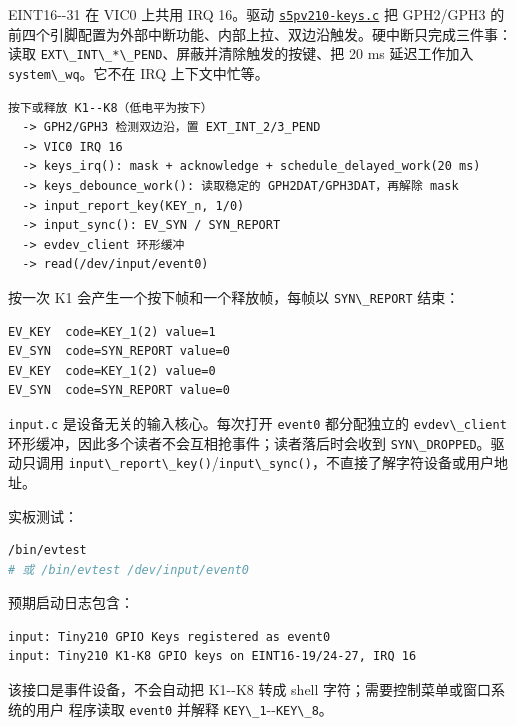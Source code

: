 EINT16-\/-31 在 VIC0 上共用 IRQ 16。驱动
\href{../../../kernel/drivers/input/keyboard/s5pv210-keys.c}{\passthrough{\lstinline!s5pv210-keys.c!}}
把 GPH2/GPH3
的前四个引脚配置为外部中断功能、内部上拉、双边沿触发。硬中断只完成三件事：读取
\passthrough{\lstinline!EXT\_INT\_*\_PEND!}、屏蔽并清除触发的按键、把 20
ms 延迟工作加入 \passthrough{\lstinline!system\_wq!}。它不在 IRQ
上下文中忙等。

\begin{lstlisting}
按下或释放 K1--K8（低电平为按下）
  -> GPH2/GPH3 检测双边沿，置 EXT_INT_2/3_PEND
  -> VIC0 IRQ 16
  -> keys_irq(): mask + acknowledge + schedule_delayed_work(20 ms)
  -> keys_debounce_work(): 读取稳定的 GPH2DAT/GPH3DAT，再解除 mask
  -> input_report_key(KEY_n, 1/0)
  -> input_sync(): EV_SYN / SYN_REPORT
  -> evdev_client 环形缓冲
  -> read(/dev/input/event0)
\end{lstlisting}

按一次 K1 会产生一个按下帧和一个释放帧，每帧以
\passthrough{\lstinline!SYN\_REPORT!} 结束：

\begin{lstlisting}
EV_KEY  code=KEY_1(2) value=1
EV_SYN  code=SYN_REPORT value=0
EV_KEY  code=KEY_1(2) value=0
EV_SYN  code=SYN_REPORT value=0
\end{lstlisting}

\passthrough{\lstinline!input.c!} 是设备无关的输入核心。每次打开
\passthrough{\lstinline!event0!} 都分配独立的
\passthrough{\lstinline!evdev\_client!}
环形缓冲，因此多个读者不会互相抢事件；读者落后时会收到
\passthrough{\lstinline!SYN\_DROPPED!}。驱动只调用
\passthrough{\lstinline!input\_report\_key()!}/\passthrough{\lstinline!input\_sync()!}，不直接了解字符设备或用户地址。

实板测试：

\begin{lstlisting}[language=sh]
/bin/evtest
# 或 /bin/evtest /dev/input/event0
\end{lstlisting}

预期启动日志包含：

\begin{lstlisting}
input: Tiny210 GPIO Keys registered as event0
input: Tiny210 K1-K8 GPIO keys on EINT16-19/24-27, IRQ 16
\end{lstlisting}

该接口是事件设备，不会自动把 K1-\/-K8 转成 shell
字符；需要控制菜单或窗口系统的用户 程序读取
\passthrough{\lstinline!event0!} 并解释
\passthrough{\lstinline!KEY\_1!}-\/-\passthrough{\lstinline!KEY\_8!}。

